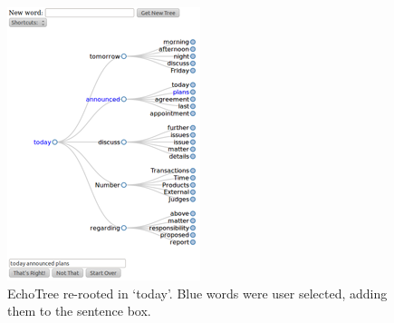 \documentclass{sigchi}
\begin{document}
\begin{figure}
   \centering
   \includegraphics[width=\columnwidth]{Figs/echoTreeRootTodaySmall.png}
   \caption{EchoTree re-rooted in `today'. Blue words were user
     selected, adding them to the sentence box.}
   \label{fig:todayTree}
\end{figure}
\end{document}
